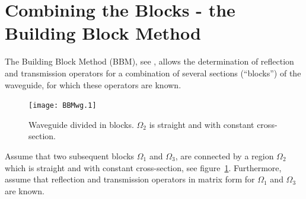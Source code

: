 \documentclass[a4paper,11pt]{article}
\renewcommand{\Lambda}{\varLambda}
\renewcommand{\Lambda}{\varLambda}
\begin{document}


\section{Combining the Blocks - the Building Block Method}
\label{sec:comb-blocks-build}

The Building Block Method (BBM), see \cite{nilssonbrander1981b},
allows the determination of reflection and transmission operators for
a combination of several sections (``blocks'') of the waveguide, for
which these operators are known.  

\begin{figure}[htb]
  \centering
  \texttt{[image: BBMwg.1]}
  \caption{Waveguide divided in blocks. $\Omega_2$ is straight and
    with constant cross-section.}
  \label{fig:wg4}
\end{figure}


Assume that two subsequent blocks $\Omega_1$ and $\Omega_3$, are
connected by a region $\Omega_2$ which is straight and with constant
cross-section, see figure~\ref{fig:wg4}. 
Furthermore, assume that
reflection and transmission operators in matrix form for $\Omega_1$
and $\Omega_3$ are known. 
\end{document}
